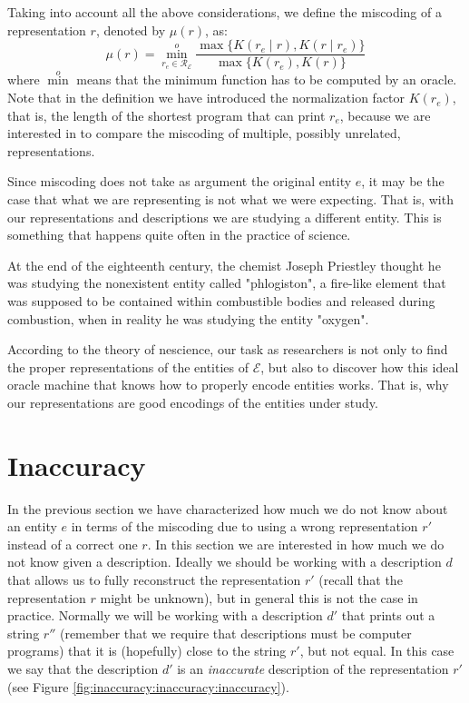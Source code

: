 Taking into account all the above considerations, we define the miscoding of a representation $r$, denoted by $\mu(r)$, as:
\[
\mu(r) = \overset{o}{ \underset{r_e \in \mathcal{R}_\mathcal{E}} \min} \frac{ \max\{ K(r_e \mid r), K(r \mid r_e) \} } { \max\{ K(r_e), K(r) \} }
\]
where $\overset{o} \min$ means that the minimum function has to be computed by an oracle. Note that in the definition we have introduced the normalization factor $K(r_e)$, that is, the length of the shortest program that can print $r_e$, because we are interested in to compare the miscoding of multiple, possibly unrelated, representations.

Since miscoding does not take as argument the original entity $e$, it may be the case that what we are representing is not what we were expecting. That is, with our representations and descriptions we are studying a different entity. This is something that happens quite often in the practice of science. 

\begin{example}
At the end of the eighteenth century, the chemist Joseph Priestley thought he was studying the nonexistent entity called "phlogiston", a fire-like element that was supposed to be contained within combustible bodies and released during combustion, when in reality he was studying the entity "oxygen".
\end{example}

According to the theory of nescience, our task as researchers is not only to find the proper representations of the entities of $\mathcal{E}$, but also to discover how this ideal oracle machine that knows how to properly encode entities works. That is, why our representations are good encodings of the entities under study.

%
%

\section{Inaccuracy}
\label{sec:introduction:inaccuracy}

In the previous section we have characterized how much we do not know about an entity $e$ in terms of the miscoding due to using a wrong representation $r'$ instead of a correct one $r$. In this section we are interested in how much we do not know given a description. Ideally we should be working with a description $d$ that allows us to fully reconstruct the representation $r'$ (recall that the representation $r$ might be unknown), but in general this is not the case in practice. Normally we will be working with a description $d'$ that prints out a string $r''$ (remember that we require that descriptions must be computer programs) that it is (hopefully) close to the string $r'$, but not equal. In this case we say that the description $d'$ is an \emph{inaccurate} description of the representation $r'$ (see Figure \ref{fig:inaccuracy:inaccuracy:inaccuracy}).

